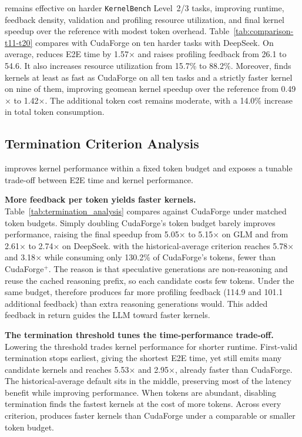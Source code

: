 \sysname{} remains effective on harder \texttt{KernelBench} Level~2/3 tasks,
improving runtime, feedback density, validation and profiling resource utilization, and
final kernel speedup over the reference with modest token overhead.
Table~\ref{tab:comparison-t11-t20} compares \sysname{} with CudaForge on ten
harder tasks with DeepSeek.
On average, \sysname{} reduces E2E time by 1.57$\times$ and raises profiling
feedback from 26.1 to 54.6.
It also increases resource utilization from 15.7\% to 88.2\%.
Moreover, \sysname{} finds kernels at least as fast as CudaForge on all ten tasks and a
strictly faster kernel on nine of them, improving geomean kernel speedup over
the reference from 0.49$\times$ to 1.42$\times$.
The additional token cost remains moderate, with a 14.0\%
increase in total token consumption.

\subsection{Termination Criterion Analysis}\label{subsec:eval_termination_analysis}

\sysname{} improves kernel performance within a fixed token budget and
exposes a tunable trade-off between E2E time and kernel performance.


\noindent\textbf{More feedback per token yields faster kernels.}
Table~\ref{tab:termination_analysis} compares \sysname{} against CudaForge under
matched token budgets.
Simply doubling CudaForge's token budget barely improves performance, raising the
final speedup from 5.05$\times$ to 5.15$\times$ on GLM and from 2.61$\times$
to 2.74$\times$ on DeepSeek.
\sysname{} with the historical-average criterion reaches 5.78$\times$ and
3.18$\times$ while consuming only 130.2\% of CudaForge's tokens, fewer than
CudaForge$^+$.
The reason is that speculative generations are non-reasoning and reuse the
cached reasoning prefix, so each candidate costs few tokens.
Under the same budget, \sysname{} therefore produces far more profiling feedback
(114.9 and 101.1 additional feedback) than extra reasoning generations would.
This added feedback in return guides the LLM toward faster kernels.

\noindent\textbf{The termination threshold tunes the time-performance trade-off.}
Lowering the threshold trades kernel performance for shorter runtime.
First-valid termination stops earliest, giving the shortest E2E time, 
yet still emits many candidate kernels and reaches
5.53$\times$ and 2.95$\times$, already faster than CudaForge.
The historical-average default sits in the middle, preserving most of the latency
benefit while improving performance.
When tokens are abundant, disabling termination finds the fastest kernels at the cost of more tokens.
Across every criterion, \sysname{} produces faster kernels than CudaForge under a
comparable or smaller token budget.

